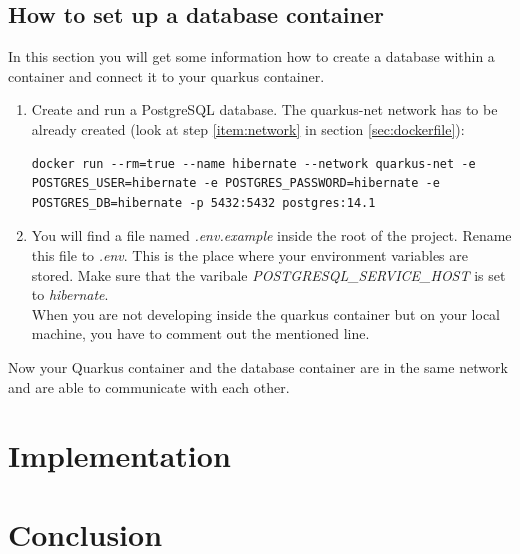     \section{How to set up a database container}\label{sec:database}
        In this section you will get some information how to create a database within a container and connect it to your quarkus container.  
        \begin{enumerate}
            \item Create and run a PostgreSQL database. The quarkus-net network has to be already created (look at step \ref{item:network} in section \ref{sec:dockerfile}):
            \begin{lstlisting}[style=bash]
docker run --rm=true --name hibernate --network quarkus-net -e POSTGRES_USER=hibernate -e POSTGRES_PASSWORD=hibernate -e POSTGRES_DB=hibernate -p 5432:5432 postgres:14.1
            \end{lstlisting}
            \item You will find a file named \textit{.env.example} inside the root of the project. Rename this file to \textit{.env}. This is the place where your environment variables are stored. Make sure that the varibale \textit{POSTGRESQL\_SERVICE\_HOST} is set to \textit{hibernate}. \\
            When you are not developing inside the quarkus container but on your local machine, you have to comment out the mentioned line. 
        \end{enumerate}
        Now your Quarkus container and the database container are in the same network and are able to communicate with each other. 

    

\chapter{Implementation}


\chapter{Conclusion} %

